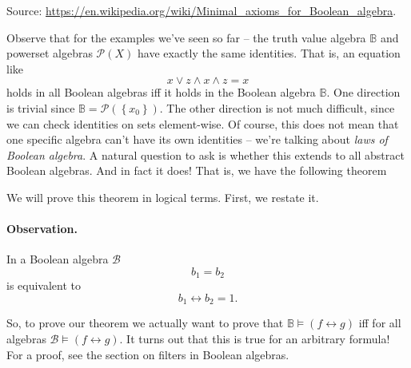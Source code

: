 \begin{thm}[NAND axiomatisation]
\label{NANDAxioms}
\hypertarget{NANDAxioms}
An algebraic structure \( \mathcal{B} = (B, |) \) with the following axiom
\[ 
    ((a|b)|c)|(a|((a|c)|a)) = c 
]
is a Boolean algebra, when \( | \) is interpreted as the NAND operator.
\end{thm}

Source: \url{https://en.wikipedia.org/wiki/Minimal_axioms_for_Boolean_algebra}.

Observe that for the examples we've seen so far -- the truth value algebra \( \mathbb{B} \) and powerset algebras \( \mathcal{P}(X) \) have exactly the same identities. That is, an equation like
\[ 
    x \vee z \wedge x \wedge z = x 
\]
holds in all Boolean algebras iff it holds in the Boolean algebra \( \mathbb{B} \). One direction is trivial since \( \mathbb{B} = \mathcal{P}( \left\{  x_0 \right\} ) \). The other direction is not much difficult, since we can check identities on sets element-wise. Of course, this does not mean that one specific algebra can't have its own identities -- we're talking about \emph{laws of Boolean algebra}. A natural question to ask is whether this extends to all abstract Boolean algebras. And in fact it does! That is, we have the following theorem

We will prove this theorem in logical terms. First, we restate it.
\paragraph{Observation.} In a Boolean algebra \( \mathcal{B} \)
\[ 
    b_1 = b_2 
\]
is equivalent to
\[ 
    b_1 \leftrightarrow b_2 = 1. 
\]
So, to prove our theorem we actually want to prove that \( \mathbb{B} \models (f \leftrightarrow g) \) iff for all algebras \( \mathcal{B} \models (f \leftrightarrow g) \). It turns out that this is true for an arbitrary formula! For a proof, see the section on filters in Boolean algebras.

